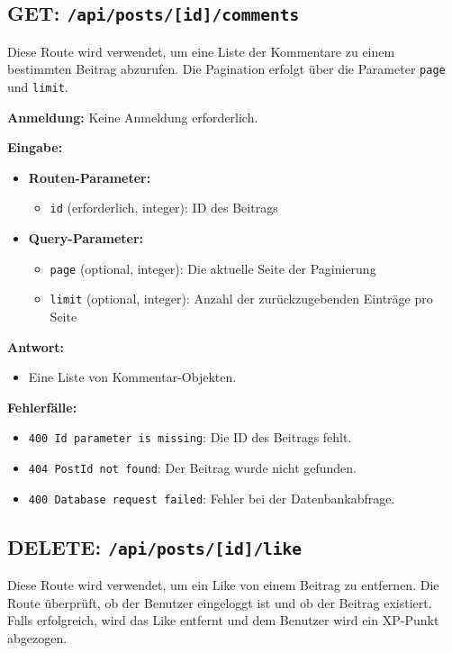 \documentclass[a4paper,12pt]{article}
\begin{document}
\newpage
\subsection{GET: \texttt{/api/posts/[id]/comments}}

Diese Route wird verwendet, um eine Liste der Kommentare zu einem bestimmten
Beitrag abzurufen. Die Pagination erfolgt über die Parameter \texttt{page} und
\texttt{limit}.

\textbf{Anmeldung:} Keine Anmeldung erforderlich.

\textbf{Eingabe:}
\begin{itemize}
    \item \textbf{Routen-Parameter:}
    \begin{itemize}
        \item \texttt{id} (erforderlich, integer): ID des Beitrags
    \end{itemize}
    \item \textbf{Query-Parameter:}
    \begin{itemize}
        \item \texttt{page} (optional, integer):
            Die aktuelle Seite der Paginierung
        \item \texttt{limit} (optional, integer):
            Anzahl der zurückzugebenden Einträge pro Seite
    \end{itemize}
\end{itemize}

\textbf{Antwort:}
\begin{itemize}
    \item Eine Liste von Kommentar-Objekten.
\end{itemize}

\textbf{Fehlerfälle:}
\begin{itemize}
    \item \texttt{400 Id parameter is missing}:
        Die ID des Beitrags fehlt.
    \item \texttt{404 PostId not found}:
        Der Beitrag wurde nicht gefunden.
    \item \texttt{400 Database request failed}:
        Fehler bei der Datenbankabfrage.
\end{itemize}

\newpage
\subsection{DELETE: \texttt{/api/posts/[id]/like}}

Diese Route wird verwendet, um ein Like von einem Beitrag zu entfernen. Die
Route überprüft, ob der Benutzer eingeloggt ist und ob der Beitrag existiert.
Falls erfolgreich, wird das Like entfernt und dem Benutzer wird ein XP-Punkt
abgezogen.
\end{document}
